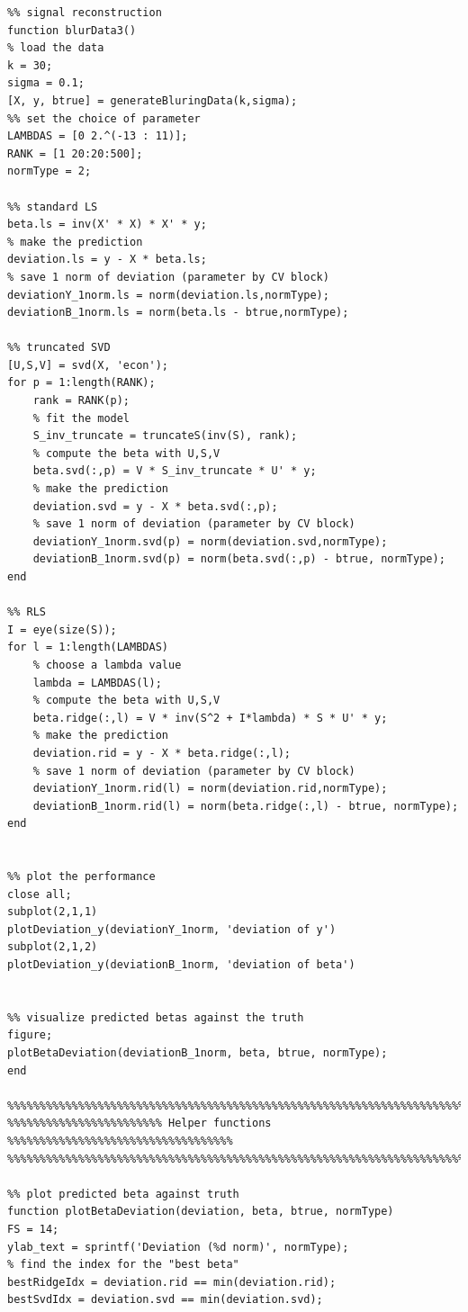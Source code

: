 \documentclass[paper=a4, fontsize=11pt]{scrartcl} %
\numberwithin{equation}{section} %
\numberwithin{figure}{section} %
\numberwithin{table}{section} %
\begin{document}
\newpage
\begin{lstlisting}
%% signal reconstruction
function blurData3()
% load the data
k = 30; 
sigma = 0.1; 
[X, y, btrue] = generateBluringData(k,sigma);
%% set the choice of parameter 
LAMBDAS = [0 2.^(-13 : 11)];
RANK = [1 20:20:500];
normType = 2; 

%% standard LS
beta.ls = inv(X' * X) * X' * y;
% make the prediction
deviation.ls = y - X * beta.ls;
% save 1 norm of deviation (parameter by CV block)
deviationY_1norm.ls = norm(deviation.ls,normType);
deviationB_1norm.ls = norm(beta.ls - btrue,normType);

%% truncated SVD
[U,S,V] = svd(X, 'econ');
for p = 1:length(RANK);
    rank = RANK(p);
    % fit the model
    S_inv_truncate = truncateS(inv(S), rank);
    % compute the beta with U,S,V
    beta.svd(:,p) = V * S_inv_truncate * U' * y;
    % make the prediction
    deviation.svd = y - X * beta.svd(:,p);
    % save 1 norm of deviation (parameter by CV block)
    deviationY_1norm.svd(p) = norm(deviation.svd,normType);
    deviationB_1norm.svd(p) = norm(beta.svd(:,p) - btrue, normType);
end

%% RLS
I = eye(size(S));
for l = 1:length(LAMBDAS)
    % choose a lambda value
    lambda = LAMBDAS(l);
    % compute the beta with U,S,V
    beta.ridge(:,l) = V * inv(S^2 + I*lambda) * S * U' * y;
    % make the prediction
    deviation.rid = y - X * beta.ridge(:,l);
    % save 1 norm of deviation (parameter by CV block)
    deviationY_1norm.rid(l) = norm(deviation.rid,normType);
    deviationB_1norm.rid(l) = norm(beta.ridge(:,l) - btrue, normType);
end


%% plot the performance 
close all; 
subplot(2,1,1)
plotDeviation_y(deviationY_1norm, 'deviation of y')
subplot(2,1,2)
plotDeviation_y(deviationB_1norm, 'deviation of beta')


%% visualize predicted betas against the truth
figure;
plotBetaDeviation(deviationB_1norm, beta, btrue, normType);
end

%%%%%%%%%%%%%%%%%%%%%%%%%%%%%%%%%%%%%%%%%%%%%%%%%%%%%%%%%%%%%%%%%%%%%%%%%%%%%
%%%%%%%%%%%%%%%%%%%%%%%% Helper functions %%%%%%%%%%%%%%%%%%%%%%%%%%%%%%%%%%%
%%%%%%%%%%%%%%%%%%%%%%%%%%%%%%%%%%%%%%%%%%%%%%%%%%%%%%%%%%%%%%%%%%%%%%%%%%%%%

%% plot predicted beta against truth
function plotBetaDeviation(deviation, beta, btrue, normType)
FS = 14;
ylab_text = sprintf('Deviation (%d norm)', normType);
% find the index for the "best beta"
bestRidgeIdx = deviation.rid == min(deviation.rid);
bestSvdIdx = deviation.svd == min(deviation.svd);


\end{lstlisting}
\end{document}
